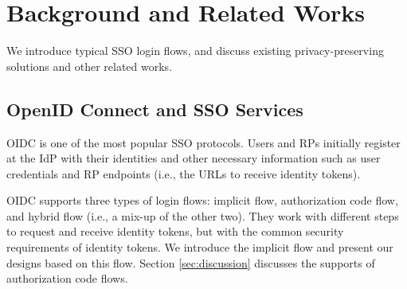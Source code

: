 \section{Background and Related Works}
\label{sec:background}

We introduce %
  typical SSO login flows,
 and discuss existing privacy-preserving solutions and other related works.

\subsection{OpenID Connect and SSO Services}
\label{subsec:OIDC}
OIDC is one of the most popular SSO protocols. %
Users and RPs initially register at the IdP with their identities %
and other necessary information such as user credentials %
 and RP endpoints (i.e., the URLs to receive identity tokens).

OIDC supports three types of login flows: implicit flow, authorization code flow, and hybrid flow (i.e., a mix-up of the other two).
They work with different steps to request and receive identity tokens,
    but with the common security requirements of identity tokens.
We introduce the implicit flow and present our designs based on this flow.
Section \ref{sec:discussion} discusses the supports of authorization code flows.

